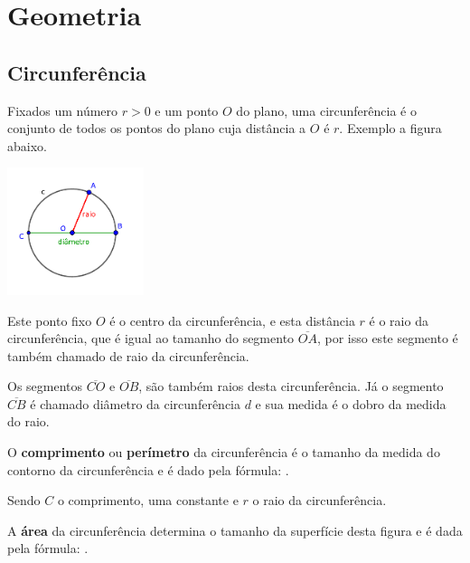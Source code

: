
\chapter{Geometria}
\section{Circunferência}

\begin{obs}
  Fixados um número $r>0$ e um ponto $O$ do plano, uma circunferência é o conjunto de todos os pontos do plano cuja distância a $O$ é $r$. 
  Exemplo a figura abaixo.
\end{obs}

 \begin{center}
 \includegraphics[width=4cm]{./cap_geometria/figs/circunferencia}
 \end{center}

Este ponto fixo $O$ é o centro da circunferência, e esta distância $r$ é o raio da circunferência, que é igual ao tamanho do segmento $\overline{OA}$, por isso este segmento é também chamado de raio da circunferência.

Os segmentos $\overline{CO}$ e $\overline{OB}$, são também raios desta circunferência. Já o segmento $\overline{CB}$ é chamado diâmetro da circunferência $d$ e sua medida é o dobro da medida do raio.

O \textbf{comprimento} ou \textbf{perímetro} da circunferência é o tamanho da medida do contorno da circunferência e é dado pela fórmula:
.

Sendo $C$ o comprimento,  uma constante e $r$ o raio da circunferência.

A \textbf{área} da circunferência determina o tamanho da superfície desta figura e é dada pela fórmula:
.


